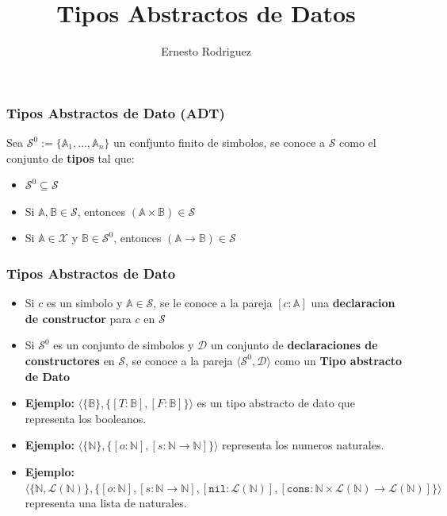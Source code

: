 \documentclass{beamer}
\title[Abstractos]{Tipos Abstractos de Datos}
\author{Ernesto Rodriguez}
\institute{
    Universidad del Itsmo \\
    \medskip \textit{erodriguez@unis.edu.gt}
}
\date[\today]{}
\begin{document}
\begin{frame}
    \maketitle
\end{frame}

\begin{frame}
\frametitle{Tipos Abstractos de Dato (ADT)}
Sea $\mathcal{S}^0:=\{\mathbb{A}_1,\ldots,\mathbb{A}_n\}$ un confjunto finito de simbolos, se
conoce a $\mathcal{S}$ como el conjunto de {\bf tipos} tal que:
\begin{itemize}
    \item{$\mathcal{S}^0\subseteq \mathcal{S}$}
    \item{Si $\mathbb{A},\mathbb{B}\in \mathcal{S}$, entonces $(\mathbb{A}\times\mathbb{B})\in\mathcal{S}$}
    \item{Si $\mathbb{A}\in\mathcal{X}$ y $\mathbb{B}\in\mathcal{S}^0$, entonces $(\mathbb{A}\rightarrow\mathbb{B})\in\mathcal{S}$}
\end{itemize}
\end{frame}

\begin{frame}
\frametitle{Tipos Abstractos de Dato}

\begin{itemize}
    \item{Si $c$ es un simbolo y $\mathbb{A}\in\mathcal{S}$, se le conoce a la pareja $[c:\mathbb{A}]$
    una {\bf declaracion de constructor} para $c$ en $\mathcal{S}$}
    \item{Si $\mathcal{S}^0$ es un conjunto de simbolos y $\mathcal{D}$ un conjunto de {\bf declaraciones
    de constructores} en $\mathcal{S}$, se conoce a la pareja $\langle \mathcal{S}^0,\mathcal{D}\rangle$
    como un {\bf Tipo abstracto de Dato}}
    \item{{\bf Ejemplo:} $\langle \{ \mathbb{B} \}, \{ [T:\mathbb{B}], [F:\mathbb{B}] \} \rangle$ es un
    tipo abstracto de dato que representa los booleanos.}
    \item{{\bf Ejemplo:} $\langle \{ \mathbb{N} \}, \{ [o:\mathbb{N}],[s:\mathbb{N}\rightarrow
    \mathbb{N}] \} \rangle$ representa los numeros naturales.}
    \item{{\bf Ejemplo:} $\langle \{ \mathbb{N}, \mathcal{L}(\mathbb{N}) \}, \{ [o:\mathbb{N}], [s:\mathbb{N}
    \rightarrow\mathbb{N}], [\mathtt{nil}:\mathcal{L}(\mathbb{N})], [\mathtt{cons}:\mathbb{N}\times
    \mathcal{L}(\mathbb{N})\rightarrow \mathcal{L}(\mathbb{N})] \} \rangle$ representa una lista
    de naturales.}
\end{itemize}

\end{frame}
\end{document}
